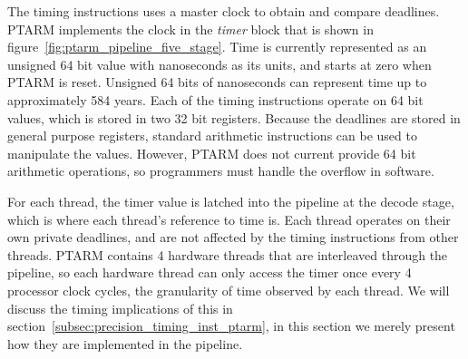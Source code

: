 \begin{table}
\noindent{}
\caption{List of assembly deadline instructions}
\label{table_deadline_insts}
\end{table}

The timing instructions uses a master clock to obtain and compare deadlines.
PTARM implements the clock in the \emph{timer} block that is shown in figure~\ref{fig:ptarm_pipeline_five_stage}.   
Time is currently represented as an unsigned 64 bit value with nanoseconds as its units, and starts at zero when PTARM is reset. 
Unsigned 64 bits of nanoseconds can represent time up to approximately 584 years.
Each of the timing instructions operate on 64 bit values, which is stored in two 32 bit registers.
Because the deadlines are stored in general purpose registers, standard arithmetic instructions can be used to manipulate the values. 
However, PTARM does not current provide 64 bit arithmetic operations, so programmers must handle the overflow in software.

For each thread, the timer value is latched into the pipeline at the decode stage, which is where each thread's reference to time is.
Each thread operates on their own private deadlines, and are not affected by the timing instructions from other threads.
PTARM contains 4 hardware threads that are interleaved through the pipeline, so each hardware thread can only access the timer once every 4 processor clock cycles, the granularity of time observed by each thread.
We will discuss the timing implications of this in section~\ref{subsec:precision_timing_inst_ptarm}, in this section we merely present how they  are implemented in the pipeline.
	
